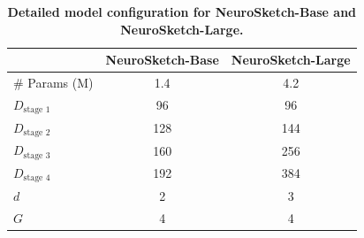 \begin{table}[htbp]
\centering
\caption{\textbf{Detailed model configuration for NeuroSketch-Base and NeuroSketch-Large.}}
\label{tab:Table.6}
\begin{tabular}{lcc}
\toprule
                                    & NeuroSketch-Base          & NeuroSketch-Large     \\ \midrule
\# Params (M)                            & 1.4                    & 4.2      \\
$D_\text{stage 1}$                  & 96                        & 96       \\
$D_\text{stage 2}$                  & 128                       & 144              \\
$D_\text{stage 3}$                  & 160                       & 256              \\
$D_\text{stage 4}$                  & 192                       & 384              \\
$d$                                 & 2                         & 3         \\
$G$                                 & 4                         & 4         \\
\bottomrule
\end{tabular}
\end{table}